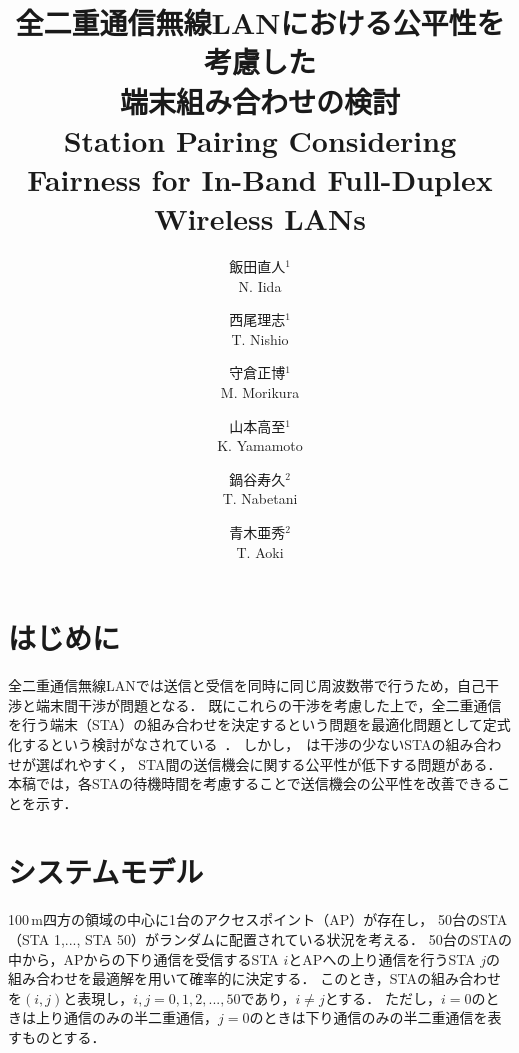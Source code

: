 \documentclass[twocolumn, a4paper]{ieicejsp}
\title{
{\bf 全二重通信無線LANにおける公平性を考慮した\\端末組み合わせの検討}
{\normalsize \\Station Pairing Considering Fairness for In-Band Full-Duplex Wireless LANs}
}
\author{
{飯田直人$^1$} \\ {N. Iida} \and
{西尾理志$^1$} \\ {T. Nishio} \and
{守倉正博$^1$} \\ {M. Morikura} \and
{山本高至$^1$} \\ {K. Yamamoto} \and
{鍋谷寿久$^2$} \\ {T. Nabetani} \and
{青木亜秀$^2$} \\ {T. Aoki}
}
\begin{document}
\maketitle
\section{はじめに}
全二重通信無線LANでは送信と受信を同時に同じ周波数帯で行うため，自己干渉と端末間干渉が問題となる．
既にこれらの干渉を考慮した上で，全二重通信を行う端末（STA）の組み合わせを決定するという問題を最適化問題として定式化するという検討がなされている~\cite{promac}．
しかし，~\cite{promac}は干渉の少ないSTAの組み合わせが選ばれやすく，
STA間の送信機会に関する公平性が低下する問題がある．
本稿では，各STAの待機時間を考慮することで送信機会の公平性を改善できることを示す．

\section{システムモデル\label{モデル}}
100\,m四方の領域の中心に1台のアクセスポイント（AP）が存在し，
50台のSTA（STA 1,..., STA 50）がランダムに配置されている状況を考える．
50台のSTAの中から，APからの下り通信を受信するSTA $i$とAPへの上り通信を行うSTA $j$の組み合わせを最適解を用いて確率的に決定する．
このとき，STAの組み合わせを$(i,j)$と表現し，$i, j = 0, 1, 2,...,50$であり，$i\neq j$とする．
ただし，$i=0$のときは上り通信のみの半二重通信，$j=0$のときは下り通信のみの半二重通信を表すものとする．
\end{document}
